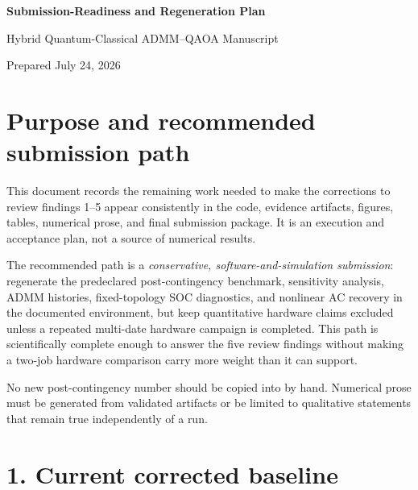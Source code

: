 \documentclass[11pt]{article}
\newcommand{\file}[1]{\path{#1}}
\begin{document}
\begin{center}
  {\Large\bfseries Submission-Readiness and Regeneration Plan}\par
  \vspace{0.35em}
  {\large Hybrid Quantum-Classical ADMM--QAOA Manuscript}\par
  \vspace{0.35em}
  Prepared July 24, 2026
\end{center}

\section*{Purpose and recommended submission path}

This document records the remaining work needed to make the corrections to
review findings 1--5 appear consistently in the code, evidence artifacts,
figures, tables, numerical prose, and final submission package.  It is an
execution and acceptance plan, not a source of numerical results.

The recommended path is a \emph{conservative, software-and-simulation
submission}: regenerate the predeclared post-contingency benchmark,
sensitivity analysis, ADMM histories, fixed-topology SOC diagnostics, and
nonlinear AC recovery in the documented environment, but keep quantitative
hardware claims excluded unless a repeated multi-date hardware campaign is
completed.  This path is scientifically complete enough to answer the five
review findings without making a two-job hardware comparison carry more
weight than it can support.

No new post-contingency number should be copied into \file{main_2.tex} by
hand.  Numerical prose must be generated from validated artifacts or be
limited to qualitative statements that remain true independently of a run.

\section*{1. Current corrected baseline}
\end{document}

